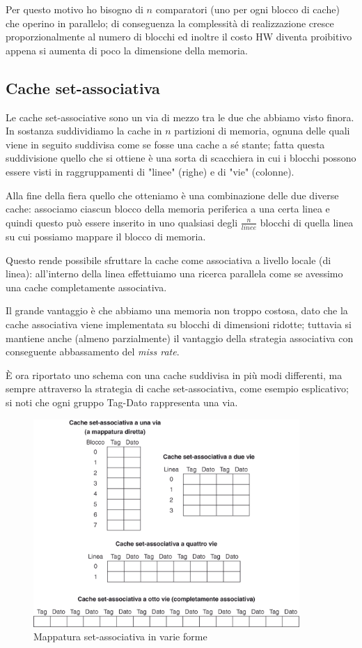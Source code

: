 \documentclass[class=book, crop=false, oneside]{standalone}
\begin{document}
Per questo motivo ho bisogno di $n$ comparatori (uno per ogni blocco di cache) che operino in parallelo; di conseguenza la complessità di realizzazione cresce proporzionalmente al numero di blocchi ed inoltre il costo HW diventa proibitivo appena si aumenta di poco la dimensione della memoria.

\subsection{Cache set-associativa}
Le cache set-associative sono un via di mezzo tra le due che abbiamo visto finora.
In sostanza suddividiamo la cache in $n$ partizioni di memoria, ognuna delle quali viene in seguito suddivisa come se fosse una cache a sé   stante; fatta questa suddivisione quello che si ottiene è una sorta di scacchiera in cui i blocchi possono essere visti in raggruppamenti di "linee" (righe) e di "vie" (colonne).

Alla fine della fiera quello che otteniamo è una combinazione delle due diverse cache: associamo ciascun blocco della memoria periferica a una certa linea e quindi questo può essere inserito in uno qualsiasi degli \(\frac{n}{linee}\) blocchi di quella linea su cui possiamo mappare il blocco di memoria.

Questo rende possibile sfruttare la cache come associativa a livello locale (di linea): all’interno della linea effettuiamo una ricerca parallela come se avessimo una cache completamente associativa.

Il grande vantaggio è che abbiamo una memoria non troppo costosa, dato che la cache associativa viene implementata su blocchi di dimensioni ridotte; tuttavia si mantiene anche (almeno parzialmente) il vantaggio della strategia associativa con conseguente abbassamento del \emph{miss rate}.

È ora riportato uno schema con una cache suddivisa in più modi differenti, ma sempre attraverso la strategia di cache set-associativa, come esempio esplicativo; si noti che ogni gruppo Tag-Dato rappresenta una via.

\begin{figure}[!h]
	\centering
	\includegraphics[width=0.9\textwidth,keepaspectratio]{mappatura-set-associativa}
	\caption{Mappatura set-associativa in varie forme}
\end{figure}
\end{document}
